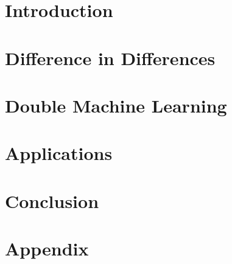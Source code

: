 \documentclass[12pt,twoside]{report}
\begin{document}




\tableofcontents



\chapter{Introduction}


\chapter{Difference in Differences}


\chapter{Double Machine Learning}


\chapter{Applications}


\chapter{Conclusion}


\appendix
\chapter{Appendix}





\end{document}
